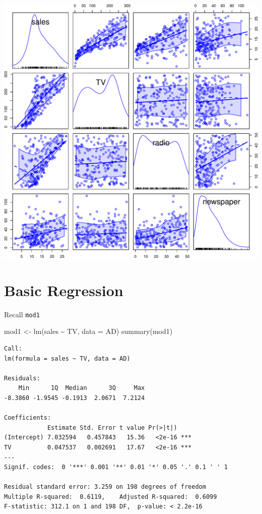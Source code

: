\documentclass[
]{article}
\newenvironment{Shaded}{\begin{snugshade}}{\end{snugshade}}
\newcommand{\AttributeTok}[1]{\textcolor[rgb]{0.77,0.63,0.00}{#1}}
\newcommand{\FunctionTok}[1]{\textcolor[rgb]{0.00,0.00,0.00}{#1}}
\newcommand{\NormalTok}[1]{#1}
\newcommand{\OtherTok}[1]{\textcolor[rgb]{0.56,0.35,0.01}{#1}}
\newcommand{\SpecialCharTok}[1]{\textcolor[rgb]{0.00,0.00,0.00}{#1}}
\begin{document}
\begin{center}\includegraphics{SDM-CHAP24_files/figure-latex/SPM-1} \end{center}

\hypertarget{basic-regression}{%
\section{Basic Regression}\label{basic-regression}}

Recall \texttt{mod1}

\begin{Shaded}
\begin{Highlighting}[]
\NormalTok{mod1 }\OtherTok{\textless{}{-}} \FunctionTok{lm}\NormalTok{(sales }\SpecialCharTok{\textasciitilde{}}\NormalTok{ TV, }\AttributeTok{data =}\NormalTok{ AD)}
\FunctionTok{summary}\NormalTok{(mod1)}
\end{Highlighting}
\end{Shaded}

\begin{verbatim}
Call:
lm(formula = sales ~ TV, data = AD)

Residuals:
    Min      1Q  Median      3Q     Max 
-8.3860 -1.9545 -0.1913  2.0671  7.2124 

Coefficients:
            Estimate Std. Error t value Pr(>|t|)    
(Intercept) 7.032594   0.457843   15.36   <2e-16 ***
TV          0.047537   0.002691   17.67   <2e-16 ***
---
Signif. codes:  0 '***' 0.001 '**' 0.01 '*' 0.05 '.' 0.1 ' ' 1

Residual standard error: 3.259 on 198 degrees of freedom
Multiple R-squared:  0.6119,    Adjusted R-squared:  0.6099 
F-statistic: 312.1 on 1 and 198 DF,  p-value: < 2.2e-16
\end{verbatim}
\end{document}

